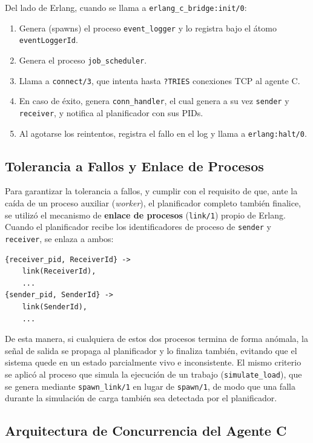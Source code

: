 \documentclass[12pt,a4paper]{article}
\begin{document}
Del lado de Erlang, cuando se llama a \texttt{erlang\_c\_bridge:init/0}:

\begin{enumerate}
  \item Genera (spawns) el proceso \texttt{event\_logger} y lo registra bajo el átomo \texttt{eventLoggerId}.
  \item Genera el proceso \texttt{job\_scheduler}.
  \item Llama a \texttt{connect/3}, que intenta hasta \texttt{?TRIES} conexiones TCP al agente C.
  \item En caso de éxito, genera \texttt{conn\_handler}, el cual genera a su vez \texttt{sender} y \texttt{receiver}, y notifica al planificador con sus PIDs.
  \item Al agotarse los reintentos, registra el fallo en el log y llama a \texttt{erlang:halt/0}.
\end{enumerate}

\subsection{Tolerancia a Fallos y Enlace de Procesos}

Para garantizar la tolerancia a fallos, y cumplir con el requisito de que, ante la caída de un proceso auxiliar (\emph{worker}), el planificador completo también finalice, se utilizó el mecanismo de \textbf{enlace de procesos} (\texttt{link/1}) propio de Erlang. Cuando el planificador recibe los identificadores de proceso de \texttt{sender} y \texttt{receiver}, se enlaza a ambos:

\begin{lstlisting}
{receiver_pid, ReceiverId} ->
    link(ReceiverId),
    ...
{sender_pid, SenderId} ->
    link(SenderId),
    ...
\end{lstlisting}

De esta manera, si cualquiera de estos dos procesos termina de forma anómala, la señal de salida se propaga al planificador y lo finaliza también, evitando que el sistema quede en un estado parcialmente vivo e inconsistente. El mismo criterio se aplicó al proceso que simula la ejecución de un trabajo (\texttt{simulate\_load}), que se genera mediante \texttt{spawn\_link/1} en lugar de \texttt{spawn/1}, de modo que una falla durante la simulación de carga también sea detectada por el planificador.

\subsection{Arquitectura de Concurrencia del Agente C}
\end{document}
